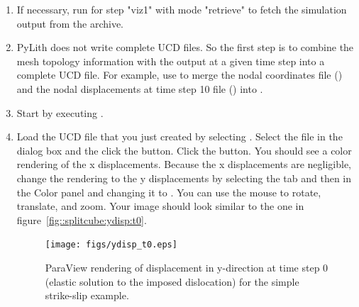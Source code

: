 \begin{enumerate}
\item If necessary, run  for step "viz1" with mode
  "retrieve" to fetch the simulation output from the archive.

  \begin{screen}
    \shellprompt{}
  \end{screen}
  
\item PyLith does not write complete UCD files. So the first step is
  to combine the mesh topology information with the output at a given
  time step into a complete UCD file. For example, use 
  to merge the nodal coordinates file
  () and the nodal displacements at
  time step 10 file () into
  .

  \begin{screen}
    \shellprompt{}
\end{screen}

\item Start  by executing .

  \begin{screen}
    \shellprompt{}
  \end{screen}
  
\item Load the UCD file that you just created by selecting
  \guiselect{}. Select the file in
  the dialog box and the click the  button. Click the
   button. You should see a color rendering of the x
  displacements. Because the x displacements are negligible, change
  the rendering to the y displacements by selecting the
   tab and then  in the
  Color panel and changing it to . You can
  use the mouse to rotate, translate, and zoom.  Your image should
  look similar to the one in figure~\ref{fig::splitcube:ydisp:t0}.
        
  \begin{figure}[htbp]
    \begin{center}
      \texttt{[image: figs/ydisp\_t0.eps]}
      \caption{ParaView rendering of displacement in y-direction at
        time step 0 (elastic solution to the imposed dislocation) for
        the simple strike-slip example.}
      \label{fig:splitcube:ydisp:t0}
    \end{center}
  \end{figure}
  

\end{enumerate}
